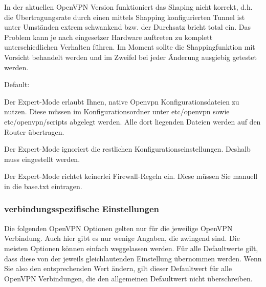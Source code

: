 \begin{description}
  In der aktuellen OpenVPN Version funktioniert das Shaping nicht
  korrekt, d.h. die Übertragungsrate durch einen mittels Shapping
  konfigurierten Tunnel ist unter Umständen extrem schwankend bzw. der
  Durchsatz bricht total ein. Das Problem kann je nach eingesetzer
  Hardware auftreten zu komplett unterschiedlichen Verhalten
  führen. Im Moment sollte die Shappingfunktion mit Vorsicht behandelt
  werden und im Zweifel bei jeder Änderung ausgiebig getestet werden.


  Default: 

  Der Expert-Mode erlaubt Ihnen, native Openvpn Konfigurationsdateien
  zu nutzen. Diese müssen im Konfigurationsordner unter etc/openvpn 
  sowie etc/openvpn/scripts
  abgelegt werden. Alle dort liegenden Dateien werden auf den Router 
  übertragen.

  Der Expert-Mode ignoriert die restlichen Konfigurationseinstellungen.
  Deshalb muss  eingestellt werden.

  Der Expert-Mode richtet keinerlei Firewall-Regeln ein. Diese müssen
  Sie manuell in die base.txt eintragen.

\end{description}

\subsubsection{verbindungsspezifische Einstellungen}

Die folgenden OpenVPN Optionen gelten nur für die jeweilige OpenVPN
Verbindung. Auch hier gibt es nur wenige Angaben, die zwingend sind.
Die meisten Optionen können einfach weggelassen werden. Für alle
Defaultwerte gilt, dass diese von der jeweils gleichlautenden
 Einstellung übernommen werden. Wenn Sie also
den entsprechenden  Wert ändern, gilt dieser
Defaultwert für alle OpenVPN Verbindungen, die den allgemeinen
Defaultwert nicht überschreiben.

